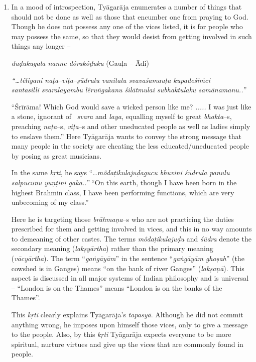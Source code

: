 \begin{enumerate}
 \item 
 In a mood of introspection, Tyāgarāja enumerates a number of things that should not be done as well as those that encumber one from praying to God. Though he does not possess any one of the vices listed, it is for people who may possess the same, so that they would desist from getting involved in such things any longer –  

 \textit{duḍukugala nanne dôrakôḍuku} (Gauḷa – Ādi)

\begin{myquote}
\textit{“…têliyani naṭa–viṭa–ṣūdrulu vanitalu svavaśamauṭa kupadeśiṁci}\\\textit{santasilli svaralayambu lêruṅgakanu śilātmulai subhaktulaku samānamanu..”}
\end{myquote}

 “Śrīrāma! Which God would save a wicked person like me? \textit{.....} I was just like a stone, ignorant of  \textit{svara} and \textit{laya}, equalling myself to great \textit{bhakta}–s, preaching \textit{naṭa}–s, \textit{viṭa}–s and other uneducated people as well as ladies simply to enslave them.” Here Tyāgarāja wants to convey the strong message that many people in the society are cheating the less educated/uneducated people by posing as great musicians.

 In the same \textit{kṛti}, he says “\textit{…môdaṭikulajuḍagucu bhuvini śūdrula panulu salpucunu yuṇṭini gāka..”} “On this earth, though I have been born in the highest Brahmin class, I have been performing functions, which are very unbecoming of my class.”

 Here he is targeting those \textit{brāhmaṇa}–s who are not practicing the duties prescribed for them and getting involved in vices, and this in no way amounts to demeaning of other castes. The terms \textit{môdaṭikulajuḍu} and \textit{śūdra} denote the secondary meaning (\textit{lakṣyārtha}) rather than the primary meaning (\textit{vācyārtha}). The term “\textit{gaṅgāyām}” in the sentence “\textit{gaṅgāyām ghoṣah}” (the cowshed is in Ganges) means “on the bank of river Ganges” (\textit{lakṣaṇā}). This aspect is discussed in all major systems of Indian philosophy and is universal – “London is on the Thames” means “London is on the banks of the Thames”.

 This \textit{kṛti} clearly explains Tyāgarāja’s \textit{tapasyā}. Although he did not commit anything wrong, he imposes upon himself those vices, only to give a message to the people. Also, by this \textit{kṛti} Tyāgarāja expects everyone to be more spiritual, nurture virtues and give up the vices that are commonly found in people.


\end{enumerate}
